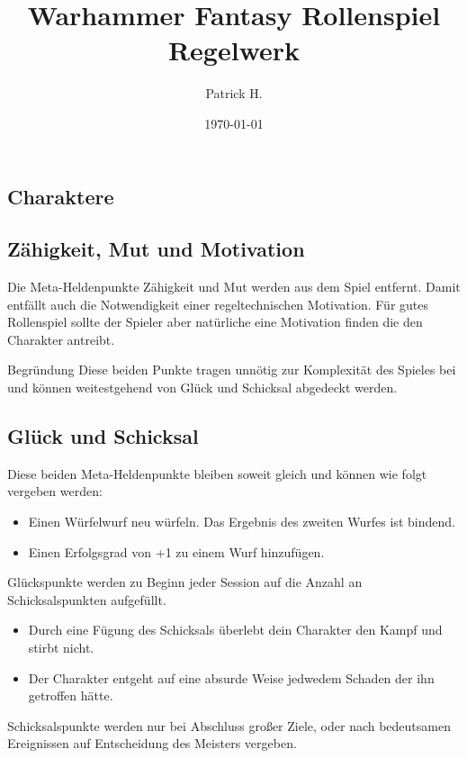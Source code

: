 \documentclass[a4paper]{article}
\title{Warhammer Fantasy Rollenspiel\\Regelwerk}
\author{Patrick H.}
\date{\today}
\begin{document}

\maketitle

\vspace{1em}

\begin{multicols}{2}
  



\section{Charaktere}

\subsection{Zähigkeit, Mut und Motivation}
Die Meta-Heldenpunkte Zähigkeit und Mut werden aus dem Spiel entfernt. 
Damit entfällt auch die Notwendigkeit einer regeltechnischen Motivation. 
Für gutes Rollenspiel sollte der Spieler aber natürliche eine Motivation finden die den Charakter antreibt.

\begin{DndComment}{Begründung}
  Diese beiden Punkte tragen unnötig zur Komplexität des Spieles bei und können weitestgehend von Glück und Schicksal abgedeckt werden.
\end{DndComment}

\subsection{Glück und Schicksal}
Diese beiden Meta-Heldenpunkte bleiben soweit gleich und können wie folgt vergeben werden:
\begin{itemize}
  \item Einen Würfelwurf neu würfeln. Das Ergebnis des zweiten Wurfes ist bindend.
  \item Einen Erfolgsgrad von +1 zu einem Wurf hinzufügen.
\end{itemize}
Glückspunkte werden zu Beginn jeder Session auf die Anzahl an Schicksalspunkten aufgefüllt.

\begin{itemize}
  \item Durch eine Fügung des Schicksals überlebt dein Charakter den Kampf und stirbt nicht.
  \item Der Charakter entgeht auf eine absurde Weise jedwedem Schaden der ihn getroffen hätte.
\end{itemize}
Schicksalspunkte werden nur bei Abschluss großer Ziele, oder nach bedeutsamen Ereignissen auf Entscheidung des Meisters vergeben.


\end{multicols}
\end{document}
